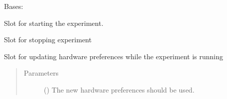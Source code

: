 \documentclass[letterpaper,10pt,english]{sphinxmanual}
\begin{document}
\begin{fulllineitems}
\label{\detokenize{NoSeMazeController/Controllers:Controllers.ExperimentControl.ExperimentController}}
\pysigstartsignatures
{}
\pysigstopsignatures
\sphinxAtStartPar
Bases: 

\begin{fulllineitems}
\label{\detokenize{NoSeMazeController/Controllers:Controllers.ExperimentControl.ExperimentController.start}}
\pysigstartsignatures
{}
\pysigstopsignatures
\sphinxAtStartPar
Slot for starting the experiment.

\end{fulllineitems}


\begin{fulllineitems}
\label{\detokenize{NoSeMazeController/Controllers:Controllers.ExperimentControl.ExperimentController.stop}}
\pysigstartsignatures
{}
\pysigstopsignatures
\sphinxAtStartPar
Slot for stopping experiment

\end{fulllineitems}


\begin{fulllineitems}
\label{\detokenize{NoSeMazeController/Controllers:Controllers.ExperimentControl.ExperimentController.update_pref}}
\pysigstartsignatures
{}
\pysigstopsignatures
\sphinxAtStartPar
Slot for updating hardware preferences while the experiment is
running
\begin{quote}\begin{description}
\item[{Parameters}] \leavevmode
\sphinxAtStartPar
{} () \textendash{} The new hardware preferences should be used.


\end{description}
\end{quote}
\end{fulllineitems}
\end{fulllineitems}
\end{document}
